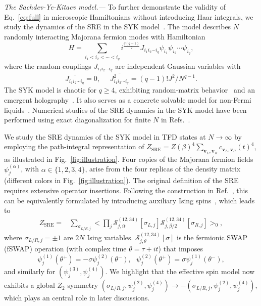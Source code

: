 \documentclass[aps,prl,twocolumn,superscriptaddress,longbibliography]{revtex4-2}
\begin{document}
 \emph{ \color{blue}The Sachdev-Ye-Kitaev model.---} To further demonstrate the validity of Eq.~\eqref{eq:full} in microscopic Hamiltonians without introducing Haar integrals, we study the dynamics of the SRE in the SYK model~\cite{Sachdev:1992fk,kitaev2014talk,maldacena2016remarks,RevModPhys.94.035004}. The model describes $N$ randomly interacting Majorana fermion modes with Hamiltonian
\begin{equation}\label{eqn:H}
  H=\sum_{i_1<i_2<\cdots<i_q}i^{\frac{q(q-1)}2}J_{i_1i_2\cdots i_q}\psi_{i_1}\psi_{i_2}\cdots\psi_{i_q},
  \end{equation}
  where the random couplings $J_{i_1i_2\cdots i_q}$ are independent Gaussian variables with
  \begin{equation}
  \overline{J_{i_1i_2\cdots i_q}}=0,\ \ \ \ \ \ \overline{J_{i_1i_2\cdots i_q}^2}=(q-1)!J^2/N^{q-1}.
  \end{equation}
  The SYK model is chaotic for $q \ge 4$, exhibiting random-matrix behavior~\cite{Cotler:2016fpe} and an emergent holography~\cite{Maldacena:2016upp,maldacena2016remarks,kitaev2014talk}. It also serves as a concrete solvable model for non-Fermi liquids~\cite{RevModPhys.94.035004}. Numerical studies of the SRE dynamics in the SYK model have been performed using exact diagonalization for finite $N$ in Refs.~\cite{Bera:2025pfp,Jasser:2025myz,njgn-fksh,Malvimat:2026oqf}.

  We study the SRE dynamics of the SYK model in TFD states at $N\rightarrow \infty$ by employing the path-integral representation of $Z_{\text{SRE}}=Z(\beta)^4\sum_{{\bm{v}_L,\bm{v}_R}}c_{\bm{v}_L,\bm{v}_R}(t)^4$, as illustrated in Fig.~\ref{fig:illustration}. Four copies of the Majorana fermion fields $\psi_j^{(\alpha)}$, with $\alpha \in \{1,2,3,4\}$, arise from the four replicas of the density matrix (different colors in Fig.~\ref{fig:illustration}). The original definition of the SRE requires extensive operator insertions. Following the construction in Ref.~\cite{Zhang:2025rky}, this can be equivalently formulated by introducing auxiliary Ising spins~\cite{SM}, which leads to
  \begin{equation}
  \begin{aligned}
  Z_{\text{SRE}}=&\sum_{\sigma_{L/R,j}}\Big< \prod_j\mathcal{S}_{j,it}^{(12,34)}[\sigma_{L,j}]\mathcal{S}_{j,\beta/2}^{(12,34)}[\sigma_{R,j}] \Big>_0,
  \end{aligned}
  \end{equation}
  where $\sigma_{L/R,j}=\pm 1$ are $2N$ Ising variables. $\mathcal{S}_{j,\theta}^{(12,34)}[\sigma]$ is the fermionic SWAP (fSWAP) operation (with complex time $\theta=\tau+it$) that imposes
  \begin{equation}
  \psi_j^{(1)}(\theta^+)=-\sigma\psi_j^{(2)}(\theta^-),\ \ \ \psi_j^{(2)}(\theta^+)=\sigma\psi_j^{(1)}(\theta^-),
  \end{equation}
  and similarly for $(\psi_j^{(3)},\psi_j^{(4)})$. We highlight that the effective spin model now exhibits a global $Z_2$ symmetry $(\sigma_{L/R,j},\psi^{(2)}_j,\psi^{(4)}_j)\rightarrow -(\sigma_{L/R,j},\psi^{(2)}_j,\psi^{(4)}_j)$, which plays an central role in later discussions.
\end{document}
